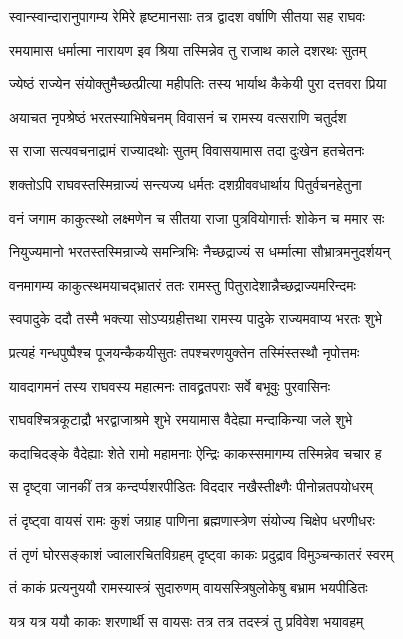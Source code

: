 \twolineshloka
{स्वान्स्वान्दारानुपागम्य रेमिरे हृष्टमानसाः}
{तत्र द्वादश वर्षाणि सीतया सह राघवः}%

\twolineshloka
{रमयामास धर्मात्मा नारायण इव श्रिया}
{तस्मिन्नेव तु राजाथ काले दशरथः सुतम्}%

\twolineshloka
{ज्येष्ठं राज्येन संयोक्तुमैच्छत्प्रीत्या महीपतिः}
{तस्य भार्याथ कैकेयी पुरा दत्तवरा प्रिया}%

\twolineshloka
{अयाचत नृपश्रेष्ठं भरतस्याभिषेचनम्}
{विवासनं च रामस्य वत्सराणि चतुर्दश}%

\twolineshloka
{स राजा सत्यवचनाद्रामं राज्यादथोः सुतम्}
{विवासयामास तदा दुःखेन हतचेतनः}%

\twolineshloka
{शक्तोऽपि राघवस्तस्मिन्राज्यं सन्त्यज्य धर्मतः}
{दशग्रीववधार्थाय पितुर्वचनहेतुना}%

\twolineshloka
{वनं जगाम काकुत्स्थो लक्ष्मणेन च सीतया}
{राजा पुत्रवियोगार्त्तः शोकेन च ममार सः}%

\twolineshloka
{नियुज्यमानो भरतस्तस्मिन्राज्ये समन्त्रिभिः}
{नैच्छद्राज्यं स धर्म्मात्मा सौभ्रात्रमनुदर्शयन्}%

\twolineshloka
{वनमागम्य काकुत्स्थमयाचद्भ्रातरं ततः}
{रामस्तु पितुरादेशान्नैच्छद्राज्यमरिन्दमः}%

\twolineshloka
{स्वपादुके ददौ तस्मै भक्त्या सोऽप्यग्रहीत्तथा}
{रामस्य पादुके राज्यमवाप्य भरतः शुभे}%

\twolineshloka
{प्रत्यहं गन्धपुष्पैश्च पूजयन्कैकयीसुतः}
{तपश्चरणयुक्तेन तस्मिंस्तस्थौ नृपोत्तमः}%

\twolineshloka
{यावदागमनं तस्य राघवस्य महात्मनः}
{तावद्व्रतपराः सर्वे बभूवुः पुरवासिनः}%

\twolineshloka
{राघवश्चित्रकूटाद्रौ भरद्वाजाश्रमे शुभे}
{रमयामास वैदेह्या मन्दाकिन्या जले शुभे}%

\twolineshloka
{कदाचिदङ्के वैदेह्याः शेते रामो महामनाः}
{ऐन्द्रिः काकस्समागम्य तस्मिन्नेव चचार ह}%

\twolineshloka
{स दृष्ट्वा जानकीं तत्र कन्दर्प्पशरपीडितः}
{विददार नखैस्तीक्ष्णैः पीनोन्नतपयोधरम्}%

\twolineshloka
{तं दृष्ट्वा वायसं रामः कुशं जग्राह पाणिना}
{ब्रह्मणास्त्रेण संयोज्य चिक्षेप धरणीधरः}%

\twolineshloka
{तं तृणं घोरसङ्काशं ज्वालारचितविग्रहम्}
{दृष्ट्वा काकः प्रदुद्राव विमुञ्चन्कातरं स्वरम्}%

\twolineshloka
{तं काकं प्रत्यनुययौ रामस्यास्त्रं सुदारुणम्}
{वायसस्त्रिषुलोकेषु बभ्राम भयपीडितः}%

\twolineshloka
{यत्र यत्र ययौ काकः शरणार्थी स वायसः}
{तत्र तत्र तदस्त्रं तु प्रविवेश भयावहम्}%

